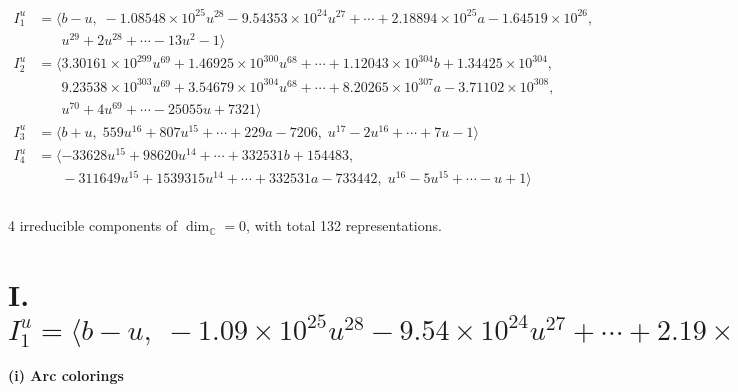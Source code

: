 \documentclass[1p]{elsarticle_modified}
\theoremstyle{definition}
\begin{document}
\begin{align*}
I^u_{1}&=\langle 
b- u,\;-1.08548\times10^{25} u^{28}-9.54353\times10^{24} u^{27}+\cdots+2.18894\times10^{25} a-1.64519\times10^{26},\\
\phantom{I^u_{1}}&\phantom{= \langle  }u^{29}+2 u^{28}+\cdots-13 u^2-1\rangle \\
I^u_{2}&=\langle 
3.30161\times10^{299} u^{69}+1.46925\times10^{300} u^{68}+\cdots+1.12043\times10^{304} b+1.34425\times10^{304},\\
\phantom{I^u_{2}}&\phantom{= \langle  }9.23538\times10^{303} u^{69}+3.54679\times10^{304} u^{68}+\cdots+8.20265\times10^{307} a-3.71102\times10^{308},\\
\phantom{I^u_{2}}&\phantom{= \langle  }u^{70}+4 u^{69}+\cdots-25055 u+7321\rangle \\
I^u_{3}&=\langle 
b+u,\;559 u^{16}+807 u^{15}+\cdots+229 a-7206,\;u^{17}-2 u^{16}+\cdots+7 u-1\rangle \\
I^u_{4}&=\langle 
-33628 u^{15}+98620 u^{14}+\cdots+332531 b+154483,\\
\phantom{I^u_{4}}&\phantom{= \langle  }-311649 u^{15}+1539315 u^{14}+\cdots+332531 a-733442,\;u^{16}-5 u^{15}+\cdots- u+1\rangle \\
\\
\end{align*}
\raggedright * 4 irreducible components of $\dim_{\mathbb{C}}=0$, with total 132 representations.\\
\newpage
\renewcommand{\arraystretch}{1}
\centering \section*{I. $I^u_{1}= \langle b- u,\;-1.09\times10^{25} u^{28}-9.54\times10^{24} u^{27}+\cdots+2.19\times10^{25} a-1.65\times10^{26},\;u^{29}+2 u^{28}+\cdots-13 u^2-1 \rangle$}
\flushleft \textbf{(i) Arc colorings}\\
\end{document}

